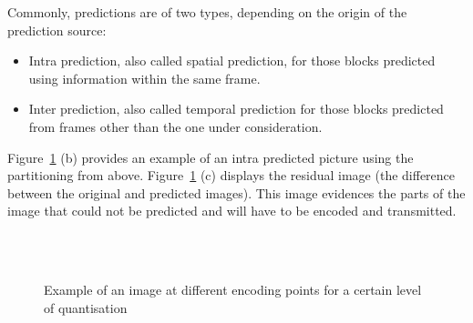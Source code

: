 \documentclass[11pt,a4paper,openright,twoside]{book}
\numberwithin{equation}{section} %
\numberwithin{figure}{section} %
\numberwithin{table}{section} %
\begin{document}
Commonly, predictions are of two types, depending on the origin of
the prediction source:
\begin{itemize}
	\item Intra prediction, also called spatial prediction, for those blocks
		predicted using information within the same frame.
	\item Inter prediction, also called temporal prediction for those blocks
		predicted from frames other than the one under consideration.
\end{itemize}

Figure~\ref{fig:part_orig_pred_res_image} (b) provides an example of an intra
predicted picture using the partitioning from above.
Figure~\ref{fig:part_orig_pred_res_image} (c) displays the residual image (the
difference between the original and predicted images).
This image evidences the parts of the image that could not be predicted and
will have to be encoded and transmitted.

\begin{figure}[tb]
	\centering
	\\
	\\
	\caption{Example of an image at different encoding points for a
	certain level of quantisation}
	\label{fig:part_orig_pred_res_image}
\end{figure}
\end{document}

